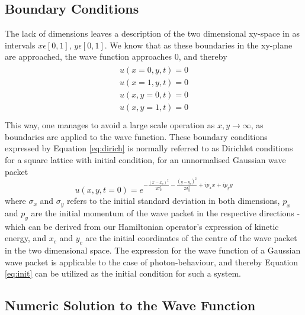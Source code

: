 \documentclass[10pt, nofootinbib, twocolumn]{revtex4-1}
\begin{document}
\subsection{Boundary Conditions}
The lack of dimensions leaves a description of the two dimensional xy-space in as intervals $x\epsilon[0,1]$, $y\epsilon[0,1]$. We know that as these boundaries in the xy-plane are approached, the wave function approaches 0, and thereby
\begin{align}\label{eq:dirich}
    \begin{split}
        u(x=0,y,t)=0 \\
        u(x=1,y,t)=0 \\
        u(x,y=0,t)=0 \\
        u(x,y=1,t)=0 \\
    \end{split}
\end{align}
This way, one manages to avoid a large scale operation as $x,y \longrightarrow \infty$, as boundaries are applied to the wave function. These boundary conditions expressed by Equation \eqref{eq:dirich} is normally referred to as Dirichlet conditions \cite[p. ~333]{notes} for a square lattice with initial condition, for an unnormalised Gaussian wave packet
\begin{equation}\label{eq:init}
    u(x,y,t=0) = e^{-\frac{(x-x_c)^2}{2 \sigma_x^2} - \frac{(y-y_c)^2}{2 \sigma_y^2} + i p_x x + i p_y y}
\end{equation}
where $\sigma_x$ and $\sigma_y$ refers to the initial standard deviation in both dimensions, $p_x$ and $p_y$ are the initial momentum of the wave packet in the respective directions - which can be derived from our Hamiltonian operator's expression of kinetic energy, and $x_c$ and $y_c$ are the initial coordinates of the centre of the wave packet in the two dimensional space. The expression for the wave function of a Gaussian wave packet is applicable to the case of photon-behaviour, and thereby Equation \eqref{eq:init} can be utilized as the initial condition for such a system. 



\subsection{Numeric Solution to the Wave Function}
\end{document}
